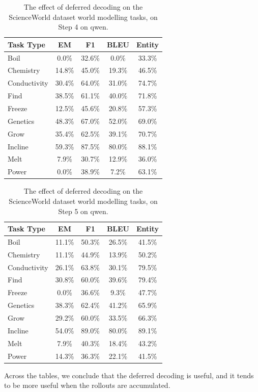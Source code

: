 \begin{table}[h]
\centering
    \setlength\tabcolsep{15pt}
    \setlength\extrarowheight{0pt}
\caption{The effect of deferred decoding on the ScienceWorld dataset \citep{wang-etal-2022-scienceworld} world modelling tasks, on Step 4 on qwen.}
\label{tab:scienceworld39}
\begin{tabular}{lcccc}
\toprule
\textbf{Task Type} & \textbf{EM} & \textbf{F1}
  & \textbf{BLEU} & \textbf{Entity}\\
\midrule
Boil & 0.0\% & 32.6\% & 0.0\% & 33.3\% \\
Chemistry & 14.8\% & 45.0\% & 19.3\% & 46.5\% \\
Conductivity & 30.4\% & 64.0\% & 31.0\% & 74.7\% \\
Find & 38.5\% & 61.1\% & 40.0\% & 71.8\% \\
Freeze & 12.5\% & 45.6\% & 20.8\% & 57.3\% \\
Genetics & 48.3\% & 67.0\% & 52.0\% & 69.0\% \\
Grow & 35.4\% & 62.5\% & 39.1\% & 70.7\% \\
Incline & 59.3\% & 87.5\% & 80.0\% & 88.1\% \\
Melt & 7.9\% & 30.7\% & 12.9\% & 36.0\% \\
Power & 0.0\% & 38.9\% & 7.2\% & 63.1\% \\

\bottomrule
\end{tabular}
\end{table}

\begin{table}[h]
\centering
    \setlength\tabcolsep{15pt}
    \setlength\extrarowheight{0pt}
\caption{The effect of deferred decoding on the ScienceWorld dataset \citep{wang-etal-2022-scienceworld} world modelling tasks, on Step 5 on qwen.}
\label{tab:scienceworld40}
\begin{tabular}{lcccc}
\toprule
\textbf{Task Type} & \textbf{EM} & \textbf{F1}
  & \textbf{BLEU} & \textbf{Entity}\\
\midrule
Boil & 11.1\% & 50.3\% & 26.5\% & 41.5\% \\
Chemistry & 11.1\% & 44.9\% & 13.9\% & 50.2\% \\
Conductivity & 26.1\% & 63.8\% & 30.1\% & 79.5\% \\
Find & 30.8\% & 60.0\% & 39.6\% & 79.4\% \\
Freeze & 0.0\% & 36.6\% & 9.3\% & 47.7\% \\
Genetics & 38.3\% & 62.4\% & 41.2\% & 65.9\% \\
Grow & 29.2\% & 60.0\% & 33.5\% & 66.3\% \\
Incline & 54.0\% & 89.0\% & 80.0\% & 89.1\% \\
Melt & 7.9\% & 40.3\% & 18.4\% & 43.2\% \\
Power & 14.3\% & 36.3\% & 22.1\% & 41.5\% \\

\bottomrule
\end{tabular}
\end{table}

Across the tables, we conclude that the deferred decoding is useful, and it tends to be more useful when the rollouts are accumulated.